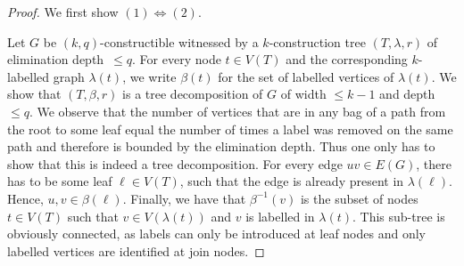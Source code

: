 \documentclass[a4paper,UKenglish,cleveref, autoref, thm-restate]{lipics-v2021}
\newcommand{\elimOrd}[2]{$(#1,#2)$-constructible}
\newcommand{\elimDepth}{elimination depth}
\begin{document}
\ekqEquiv*

\begin{proof}
	We first show $(1)\Leftrightarrow (2)$.
	
	Let $G$ be \elimOrd{k}{q} witnessed by a $k$-construction tree $(T,\lambda,r)$ of \elimDepth\ $\leq q$.
	For every node $t\in V(T)$ and the corresponding $k$-labelled graph $\lambda(t)$, we write $\beta(t)$ for the set of labelled vertices of $\lambda(t)$.
	We show that $(T,\beta,r)$ is a tree decomposition of $G$ of width $\leq k-1$ and depth $\leq q$.
	We observe that the number of vertices that are in any bag of a path from the root to some leaf equal the number of times a label was removed on the same path and therefore is bounded by the \elimDepth.
	Thus one only has to show that this is indeed a tree decomposition.
	For every edge $uv\in E(G)$, there has to be some leaf $\ell\in V(T)$, such that the edge is already present in $\lambda(\ell)$. Hence, $u,v \in \beta(\ell)$.
	Finally, we have that $\beta^{-1}(v)$ is the subset of nodes $t\in V(T)$ such that $v\in V(\lambda(t))$ and $v$ is labelled in $\lambda(t)$.
	This sub-tree is obviously connected, as labels can only be introduced at leaf nodes and only labelled vertices are identified at join nodes.
	

\end{proof}
\end{document}
